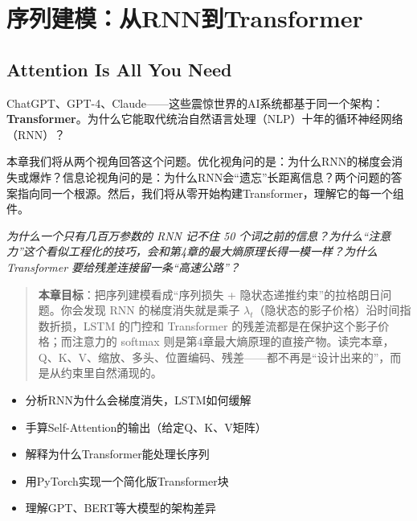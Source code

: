 \chapter{序列建模：从RNN到Transformer}

\section*{Attention Is All You Need}


ChatGPT、GPT-4、Claude——这些震惊世界的AI系统都基于同一个架构：\textbf{Transformer}。为什么它能取代统治自然语言处理（NLP）十年的循环神经网络（RNN）？

本章我们将从两个视角回答这个问题。优化视角问的是：为什么RNN的梯度会消失或爆炸？信息论视角问的是：为什么RNN会“遗忘”长距离信息？两个问题的答案指向同一个根源。然后，我们将从零开始构建Transformer，理解它的每一个组件。

\vspace{0.3cm}
\noindent\textit{为什么一个只有几百万参数的 RNN 记不住 50 个词之前的信息？为什么“注意力”这个看似工程化的技巧，会和第4章的最大熵原理长得一模一样？为什么 Transformer 要给残差连接留一条“高速公路”？}

\begin{quote}
\textbf{本章目标}：把序列建模看成“序列损失 + 隐状态递推约束”的拉格朗日问题。你会发现 RNN 的梯度消失就是乘子 $\lambda_t$（隐状态的影子价格）沿时间指数折损，LSTM 的门控和 Transformer 的残差流都是在保护这个影子价格；而注意力的 softmax 则是第4章最大熵原理的直接产物。读完本章，Q、K、V、缩放、多头、位置编码、残差——都不再是“设计出来的”，而是从约束里自然涌现的。
\end{quote}

\begin{tcolorbox}[colback=green!5, colframe=green!60!black, title=学完这章，你将能够...]
\begin{itemize}
    \item 分析RNN为什么会梯度消失，LSTM如何缓解
    \item 手算Self-Attention的输出（给定Q、K、V矩阵）
    \item 解释为什么Transformer能处理长序列
    \item 用PyTorch实现一个简化版Transformer块
    \item 理解GPT、BERT等大模型的架构差异
\end{itemize}
\end{tcolorbox}


